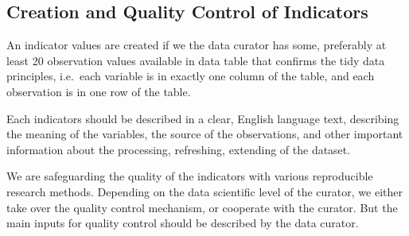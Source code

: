 \documentclass[
  a4paper,
  openany, a4paper, oneside]{book}
\begin{document}
\hypertarget{authoring-indicator}{%
\subsection{Creation and Quality Control of Indicators}\label{authoring-indicator}}

An indicator values are created if we the data curator has some, preferably at least 20 observation values available in data table that confirms the tidy data principles, i.e.~each variable is in exactly one column of the table, and each observation is in one row of the table.

Each indicators should be described in a clear, English language text, describing the meaning of the variables, the source of the observations, and other important information about the processing, refreshing, extending of the dataset.

We are safeguarding the quality of the indicators with various reproducible research methods. Depending on the data scientific level of the curator, we either take over the quality control mechanism, or cooperate with the curator. But the main inputs for quality control should be described by the data curator.
\end{document}
